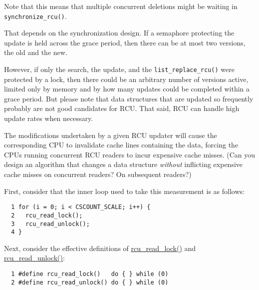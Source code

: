 Note that this means that multiple concurrent deletions might be
waiting in {\tt synchronize\_rcu()}.


That depends on the synchronization design.
If a semaphore protecting the update is held across the grace period,
then there can be at most two versions, the old and the new.

However, if only the search, the update, and the
{\tt list\_replace\_rcu()} were protected by a lock, then
there could be an arbitrary number of versions active, limited only
by memory and by how many updates could be completed within a
grace period.
But please note that data structures that are updated so frequently
probably are not good candidates for RCU.
That said, RCU can handle high update rates when necessary.


The modifications undertaken by a given RCU updater will cause the
corresponding CPU to invalidate cache lines containing the data,
forcing the CPUs running concurrent RCU readers to incur expensive
cache misses.
(Can you design an algorithm that changes a data structure \emph{without}
inflicting expensive cache misses on concurrent readers?
On subsequent readers?)


First, consider that the inner loop used to
take this measurement is as follows:

\vspace{5pt}
\begin{minipage}[t]{\columnwidth}
\small
\begin{verbatim}
  1 for (i = 0; i < CSCOUNT_SCALE; i++) {
  2   rcu_read_lock();
  3   rcu_read_unlock();
  4 }
\end{verbatim}
\end{minipage}
\vspace{5pt}

Next, consider the effective definitions of \url{rcu_read_lock()}
and \url{rcu_read_unlock()}:

\vspace{5pt}
\begin{minipage}[t]{\columnwidth}
\small
\begin{verbatim}
  1 #define rcu_read_lock()   do { } while (0)
  2 #define rcu_read_unlock() do { } while (0)
\end{verbatim}
\end{minipage}
\vspace{5pt}

